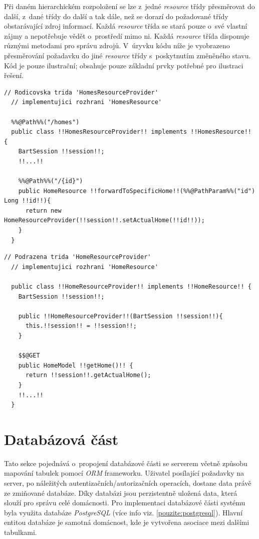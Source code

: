 Při daném hierarchickém rozpoložení se lze z~jedné \emph{resource} třídy přesměrovat do další, z~dané třídy do další a tak dále, než se dorazí do požadované třídy obstarávající zdroj informací.
Každá \emph{resource} třída se stará pouze o~své vlastní zájmy a nepotřebuje vědět o~prostředí mimo ni.
Každá \emph{resource} třída disponuje různými metodami pro správu zdrojů.
V~úryvku kódu níže je vyobrazeno přesměrování požadavku do jiné \emph{resource} třídy s~poskytnutím změněného stavu.
Kód je pouze ilustrační; obsahuje pouze základní prvky potřebné pro ilustraci řešení.
\newpage
\begin{lstlisting}[style=JavaStyle, caption={Ukázka přesměrování požadavku}]
  // Rodicovska trida 'HomesResourceProvider'
  // implementujici rozhrani 'HomesResource'

  %%@Path%%("/homes")
  public class !!HomesResourceProvider!! implements !!HomesResource!! {
    BartSession !!session!!;
    !!...!!

    %%@Path%%("/{id}")
    public HomeResource !!forwardToSpecificHome!!(%%@PathParam%%("id") Long !!id!!){
      return new HomeResourceProvider(!!session!!.setActualHome(!!id!!));
    }
  }
\end{lstlisting}

\begin{lstlisting}[style=JavaStyle, caption={Ukázka zpracování požadavku z~přesměrované třídy}]
  // Podrazena trida 'HomeResourceProvider'
  // implementujici rozhrani 'HomeResource'

  public class !!HomeResourceProvider!! implements !!HomeResource!! {
    BartSession !!session!!;

    public !!HomeResourceProvider!!(BartSession !!session!!){
      this.!!session!! = !!session!!;
    }

    $$@GET
    public HomeModel !!getHome()!! {
      return !!session!!.getActualHome();
    }
    !!...!!
  }
\end{lstlisting}

\newpage
\section{Databázová část}
\label{impl:databaze}
Tato sekce pojednává o~propojení databázové části se serverem včetně způsobu mapování tabulek pomocí \emph{ORM} frameworku.
Uživatel posílající požadavky na server, po náležitých autentizačních/autorizačních operacích, dostane data právě ze zmiňované databáze.
Díky databázi jsou perzistentně uložená data, která slouží pro správu celé domácnosti.
Pro implementaci databázové části systému byla využita databáze \emph{PostgreSQL} (více info viz. \ref{pouzite:postgresql}).
Hlavní entitou databáze je samotná domácnost, kde je vytvořena asociace mezi dalšími tabulkami.

